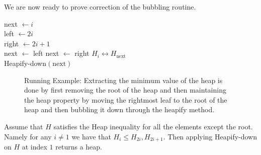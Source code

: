 \fi
We are now ready to prove correction of the bubbling routine. 

\begin{algorithm}[H]
next  $\leftarrow i  $ \\
left  $\leftarrow 2i $ \\
right $\leftarrow 2i +1 $ \\ 
 {
  next $\leftarrow$ left 
}
 {
  next $\leftarrow$  right
}
 {
  $ H_{i} \leftrightarrow H_{\text{next}} $ \\ 
  Heapify-down$\left( \text{next}  \right)$
}
\caption{ Heapify-down }
\label{alg:heapify}
\end{algorithm}


\begin{figure}[h]
  \begin{subfigure}[b]{0.23\textwidth}
	
  \end{subfigure}
\begin{subfigure}[b]{0.23\textwidth}
	
  \end{subfigure}
\begin{subfigure}[b]{0.23\textwidth}
	
  \end{subfigure}
\begin{subfigure}[b]{0.23\textwidth}
	
  \end{subfigure}
  \caption{ Running Example: Extracting the minimum value of the heap is done by first removing the root of the heap and then maintaining the heap property by moving the rightmost leaf to the root of the heap and then bubbling it down through the heapify method. } 
\end{figure}


\begin{claim}
  
Assume that $H$ satisfies the Heap inequality for all the elements except the root. Namely for any $i \neq 1$ we have that $H_{i} \le H_{2i}, H_{2i+1}$. Then applying Heapify-down on $H$ at index $1$ returns a heap.  
\end{claim}

